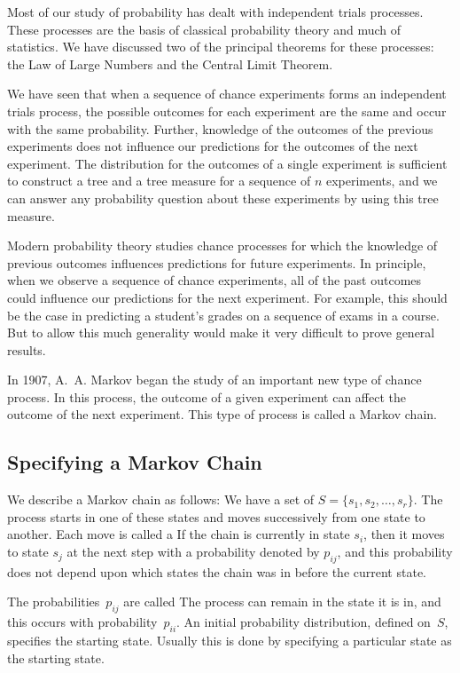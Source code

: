 \par
Most of our study of probability has dealt with independent trials processes. 
These processes are the basis of classical probability theory and much of
statistics.  We have discussed two of the principal theorems for these
processes: the Law of Large Numbers and the Central Limit Theorem.
\par
We have seen that when a sequence of chance experiments forms an independent
trials process, the possible outcomes for each experiment are the same and
occur with the same probability.  Further, knowledge of the outcomes of the
previous experiments does not influence our predictions for the outcomes of the
next experiment.  The distribution for the outcomes of a single experiment is
sufficient to construct a tree and a tree measure for a sequence of $n$
experiments, and we can answer any probability question about these 
experiments by using this tree measure.
\par
Modern probability theory studies chance processes for which the knowledge of
previous outcomes influences predictions for future experiments.  In principle,
when we observe a sequence of chance experiments, all of the past outcomes
could influence our predictions for the next experiment.  For example, this
should be the case in predicting a student's grades on a sequence of exams in a
course.  But to allow this much generality would make it very difficult to
prove general results.
\par
In 1907, A.~A. Markov began the study of an important new type of chance
process.  In this process, the outcome of a given experiment can affect the
outcome of the next experiment.  This type of process is called a Markov
chain.
\subsection*{Specifying a Markov Chain}
We  describe a Markov chain as follows:  We have a set of  $S =
\{s_1,s_2,\ldots,s_r\}$.  The process starts in
one of 
these states and moves successively from one state to another.  Each
move is called a    If the chain is currently in state $s_i$, then
it
moves to state $s_j$ at the next step with a probability denoted by $p_{ij}$,
and this
probability does not depend upon which states the chain was in before the
current state.
\par
The probabilities~$p_{ij}$ are called   The process can remain in the state
it is in,
and this occurs with probability~$p_{ii}$.  An initial probability
distribution, defined
on~$S$, specifies the starting state.  Usually this is done by specifying a
particular
state as the starting state.

